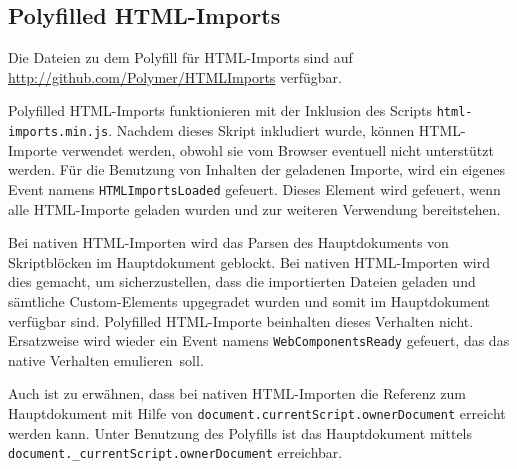 \subsection{Polyfilled HTML-Imports}
\label{sec:4_Polymer_PHTMLImports}

Die Dateien zu dem Polyfill für HTML-Imports sind auf \url{http://github.com/Polymer/HTMLImports} verfügbar.

Polyfilled HTML-Imports funktionieren mit der Inklusion des Scripts \lstinline|html-imports.min.js|. Nachdem dieses Skript inkludiert wurde, können HTML-Importe verwendet werden, obwohl sie vom Browser eventuell nicht unterstützt werden. Für die Benutzung von Inhalten der geladenen Importe, wird ein eigenes Event namens \lstinline|HTMLImportsLoaded| gefeuert. Dieses Element wird gefeuert, wenn alle HTML-Importe geladen wurden und zur weiteren Verwendung bereitstehen.

Bei nativen HTML-Importen wird das Parsen des Hauptdokuments von Skriptblöcken im Hauptdokument geblockt. Bei nativen HTML-Importen wird dies gemacht, um sicherzustellen, dass die importierten Dateien geladen und sämtliche Custom-Elements upgegradet wurden und somit im Hauptdokument verfügbar sind. Polyfilled HTML-Importe beinhalten dieses Verhalten nicht. Ersatzweise wird wieder ein Event namens \lstinline|WebComponentsReady| gefeuert, das das native Verhalten \glqq emulieren\grqq\ soll.

Auch ist zu erwähnen, dass bei nativen HTML-Importen die Referenz zum Hauptdokument mit Hilfe von \lstinline|document.currentScript.ownerDocument| erreicht werden kann. Unter Benutzung des Polyfills ist das Hauptdokument mittels \lstinline|document._currentScript.ownerDocument| erreichbar.
